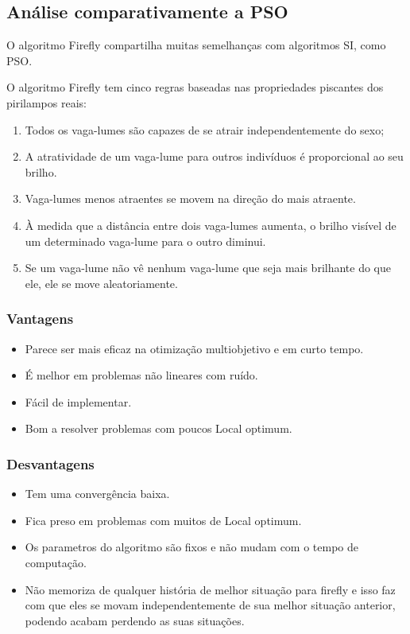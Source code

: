 \documentclass[10pt]{article}
\begin{document}
 \subsection{Análise comparativamente a PSO}
O algoritmo Firefly compartilha muitas semelhanças com 
algoritmos SI, como PSO.

O algoritmo Firefly tem cinco regras baseadas nas propriedades 
piscantes dos pirilampos reais:
\begin{enumerate}
  \item Todos os vaga-lumes são capazes de se atrair independentemente do sexo; 
  \item A atratividade de um vaga-lume para outros indivíduos é proporcional ao seu brilho. 
  \item Vaga-lumes menos atraentes se movem na direção do mais atraente. 
  \item À medida que a distância entre dois vaga-lumes aumenta, o brilho visível de um determinado vaga-lume para o outro diminui. 
  \item Se um vaga-lume não vê nenhum vaga-lume que seja mais brilhante do que ele, ele se move aleatoriamente. 
\end{enumerate}
\subsubsection{Vantagens }\label{sec:vantagens}
\begin{itemize}
  \item Parece ser mais eficaz na otimização multiobjetivo e em curto tempo.
  \item É melhor em problemas não lineares com ruído.
  \item Fácil de implementar.
  \item Bom a resolver problemas com poucos Local optimum.
\end{itemize}

\subsubsection{Desvantagens}\label{sec:desvantagens}
\begin{itemize}
  \item Tem uma convergência baixa.
  \item Fica preso em problemas com muitos de Local optimum.
  \item Os parametros do algoritmo são fixos e não mudam com o tempo de computação.
  \item Não memoriza de qualquer história de melhor
  situação para firefly e isso faz com que eles se movam
  independentemente de sua melhor situação anterior, podendo
  acabam perdendo as suas situações.
\end{itemize}
\newpage
\end{document}
